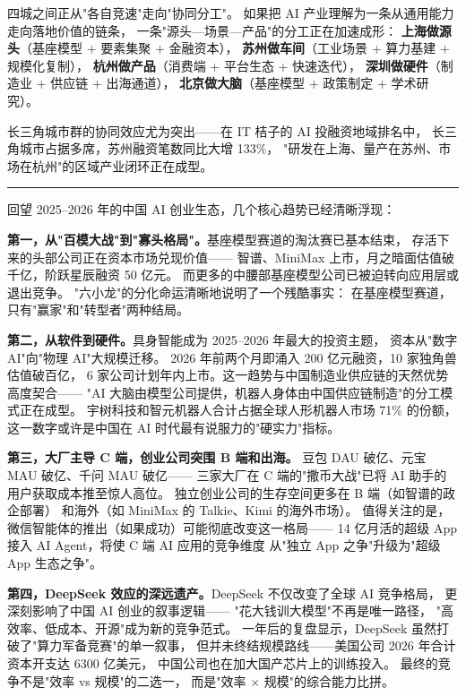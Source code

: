 四城之间正从"各自竞速"走向"协同分工"。
如果把 AI 产业理解为一条从通用能力走向落地价值的链条，
一条"源头—场景—产品"的分工正在加速成形：
\textbf{上海做源头}（基座模型 + 要素集聚 + 金融资本），
\textbf{苏州做车间}（工业场景 + 算力基建 + 规模化复制），
\textbf{杭州做产品}（消费端 + 平台生态 + 快速迭代），
\textbf{深圳做硬件}（制造业 + 供应链 + 出海通道），
\textbf{北京做大脑}（基座模型 + 政策制定 + 学术研究）。

长三角城市群的协同效应尤为突出——在 IT 桔子的 AI 投融资地域排名中，
长三角城市占据多席，苏州融资笔数同比大增 133\%，
"研发在上海、量产在苏州、市场在杭州"的区域产业闭环正在成型。


\bigskip
\noindent\rule{\textwidth}{0.5pt}
\bigskip

回望 2025--2026 年的中国 AI 创业生态，几个核心趋势已经清晰浮现：

\textbf{第一，从"百模大战"到"寡头格局"。}基座模型赛道的淘汰赛已基本结束，
存活下来的头部公司正在资本市场兑现价值——
智谱、MiniMax 上市，月之暗面估值破千亿，阶跃星辰融资 50 亿元。
而更多的中腰部基座模型公司已被迫转向应用层或退出竞争。
"六小龙"的分化命运清晰地说明了一个残酷事实：
在基座模型赛道，只有"赢家"和"转型者"两种结局。

\textbf{第二，从软件到硬件。}具身智能成为 2025--2026 年最大的投资主题，
资本从"数字 AI"向"物理 AI"大规模迁移。
2026 年前两个月即涌入 200 亿元融资，10 家独角兽估值破百亿，
6 家公司计划年内上市。这一趋势与中国制造业供应链的天然优势高度契合——
"AI 大脑由模型公司提供，机器人身体由中国供应链制造"的分工模式正在成型。
宇树科技和智元机器人合计占据全球人形机器人市场 71\% 的份额，
这一数字或许是中国在 AI 时代最有说服力的"硬实力"指标。

\textbf{第三，大厂主导 C 端，创业公司突围 B 端和出海。}
豆包 DAU 破亿、元宝 MAU 破亿、千问 MAU 破亿——
三家大厂在 C 端的"撒币大战"已将 AI 助手的用户获取成本推至惊人高位。
独立创业公司的生存空间更多在 B 端（如智谱的政企部署）
和海外（如 MiniMax 的 Talkie、Kimi 的海外市场）。
值得关注的是，微信智能体的推出（如果成功）可能彻底改变这一格局——
14 亿月活的超级 App 接入 AI Agent，将使 C 端 AI 应用的竞争维度
从"独立 App 之争"升级为"超级 App 生态之争"。

\textbf{第四，DeepSeek 效应的深远遗产。}DeepSeek 不仅改变了全球 AI 竞争格局，
更深刻影响了中国 AI 创业的叙事逻辑——
"花大钱训大模型"不再是唯一路径，
"高效率、低成本、开源"成为新的竞争范式。
一年后的复盘显示，DeepSeek 虽然打破了"算力军备竞赛"的单一叙事，
但并未终结规模路线——美国公司 2026 年合计资本开支达 6300 亿美元，
中国公司也在加大国产芯片上的训练投入。
最终的竞争不是"效率 vs 规模"的二选一，
而是"效率 $\times$ 规模"的综合能力比拼。

